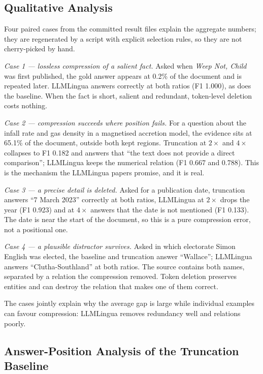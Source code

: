 \documentclass[10pt,a4paper,twocolumn]{article}
\begin{document}
\subsection{Qualitative Analysis}

Four paired cases from the committed result files explain the aggregate numbers;
they are regenerated by a script with explicit selection rules, so they are not
cherry-picked by hand.

\emph{Case 1 --- lossless compression of a salient fact.} Asked when \emph{Weep
Not, Child} was first published, the gold answer appears at 0.2\% of the document
and is repeated later. LLMLingua answers correctly at both ratios (F1 1.000), as
does the baseline. When the fact is short, salient and redundant, token-level
deletion costs nothing.

\emph{Case 2 --- compression succeeds where position fails.} For a question about
the infall rate and gas density in a magnetised accretion model, the evidence sits
at 65.1\% of the document, outside both kept regions. Truncation at $2\times$ and
$4\times$ collapses to F1 0.182 and answers that ``the text does not provide a
direct comparison''; LLMLingua keeps the numerical relation (F1 0.667 and 0.788).
This is the mechanism the LLMLingua papers promise, and it is real.

\emph{Case 3 --- a precise detail is deleted.} Asked for a publication date,
truncation answers ``7 March 2023'' correctly at both ratios, LLMLingua at
$2\times$ drops the year (F1 0.923) and at $4\times$ answers that the date is not
mentioned (F1 0.133). The date is near the start of the document, so this is a
pure compression error, not a positional one.

\emph{Case 4 --- a plausible distractor survives.} Asked in which electorate Simon
English was elected, the baseline and truncation answer ``Wallace''; LLMLingua
answers ``Clutha-Southland'' at both ratios. The source contains both names,
separated by a relation the compression removed. Token deletion preserves entities
and can destroy the relation that makes one of them correct.

The cases jointly explain why the average gap is large while individual examples
can favour compression: LLMLingua removes redundancy well and relations poorly.

\subsection{Answer-Position Analysis of the Truncation Baseline}
\label{sec:position}
\end{document}
